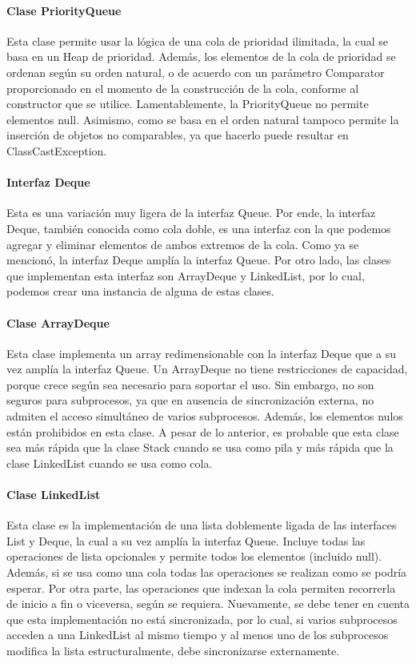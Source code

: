\documentclass{report}
\begin{document}
\paragraph{Clase PriorityQueue}
Esta clase permite usar la lógica de una cola de prioridad ilimitada, la cual se basa en un Heap de prioridad. Además, los elementos de la cola de prioridad se ordenan según su orden natural, o de acuerdo con un parámetro Comparator proporcionado en el momento de la construcción de la cola, conforme al constructor que se utilice. Lamentablemente, la PriorityQueue no permite elementos null. Asimismo, como se basa en el orden natural tampoco permite la inserción de objetos no comparables, ya que hacerlo puede resultar en ClassCastException.
\paragraph{Interfaz Deque}
Esta es una variación muy ligera de la interfaz Queue. Por ende, la interfaz Deque, también conocida como cola doble, es una interfaz con la que podemos agregar y eliminar elementos de ambos extremos de la cola. Como ya se mencionó, la interfaz Deque amplía la interfaz Queue. Por otro lado, las clases que implementan esta interfaz son ArrayDeque y LinkedList, por lo cual, podemos crear una instancia de alguna de estas clases.
\paragraph{Clase ArrayDeque}
Esta clase implementa un array redimensionable con la interfaz Deque que a su vez amplía la interfaz Queue. Un ArrayDeque no tiene restricciones de capacidad, porque crece según sea necesario para soportar el uso. Sin embargo, no son seguros para subprocesos, ya que en ausencia de sincronización externa, no admiten el acceso simultáneo de varios subprocesos. Además, los elementos nulos están prohibidos en esta clase. A pesar de lo anterior, es probable que esta clase sea más rápida que la clase Stack cuando se usa como pila y más rápida que la clase LinkedList cuando se usa como cola.
\paragraph{Clase LinkedList}
Esta clase es la implementación de una lista doblemente ligada de las interfaces List y Deque, la cual a su vez amplía la interfaz Queue. Incluye todas las operaciones de lista opcionales y permite todos los elementos (incluido null). Además, si se usa como una cola todas las operaciones se realizan como se podría esperar. Por otra parte, las operaciones que indexan la cola permiten recorrerla de inicio a fin o viceversa, según se requiera. Nuevamente, se debe tener en cuenta que esta implementación no está sincronizada, por lo cual, si varios subprocesos acceden a una LinkedList al mismo tiempo y al menos uno de los subprocesos modifica la lista estructuralmente, debe sincronizarse externamente.
\end{document}

